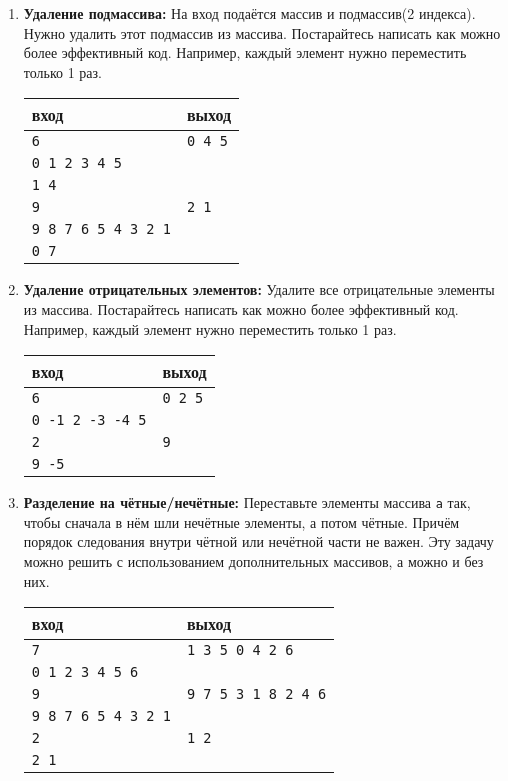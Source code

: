 \documentclass{article}
\begin{document}
\begin{enumerate}
\item \textbf{Удаление подмассива:} На вход подаётся массив и подмассив(2 индекса). Нужно удалить этот подмассив из массива. Постарайтесь написать как можно более эффективный код. Например, каждый элемент нужно переместить только 1 раз.
\begin{center}
\begin{tabular}{ l | l }
 вход & выход \\ \hline
 \texttt{6} & \texttt{0 4 5}  \\  
 \texttt{0 1 2 3 4 5} &  \\ 
 \texttt{1 4} &   \\ \hline
 \texttt{9} & \texttt{2 1}  \\  
 \texttt{9 8 7 6 5 4 3 2 1} &  \\ 
 \texttt{0 7} &   \\
\end{tabular}
\end{center}
\item \textbf{Удаление отрицательных элементов:} Удалите все отрицательные элементы из массива. Постарайтесь написать как можно более эффективный код. Например, каждый элемент нужно переместить только 1 раз.
\begin{center}
\begin{tabular}{ l | l }
 вход & выход \\ \hline
 \texttt{6} & \texttt{0 2 5}  \\  
 \texttt{0 -1 2 -3 -4 5} &  \\ \hline
 \texttt{2} & \texttt{9}  \\  
 \texttt{9 -5} &  \\ 
\end{tabular}
\end{center}
\item \textbf{Разделение на чётные/нечётные:} Переставьте элементы массива \texttt{a} так, чтобы сначала в нём шли нечётные элементы, а потом чётные. Причём порядок следования внутри чётной или нечётной части не важен. Эту задачу можно решить с использованием дополнительных массивов, а можно и без них.
\begin{center}
\begin{tabular}{ l | l }
 вход & выход \\ \hline
 \texttt{7} & \texttt{1 3 5 0 4 2 6}  \\  
 \texttt{0 1 2 3 4 5 6} & \\ \hline
 \texttt{9} & \texttt{9 7 5 3 1 8 2 4 6}  \\  
 \texttt{9 8 7 6 5 4 3 2 1} &  \\ \hline
 \texttt{2} & \texttt{1 2}  \\  
 \texttt{2 1} &  \\
\end{tabular}
\end{center}


\end{enumerate}
\end{document}
